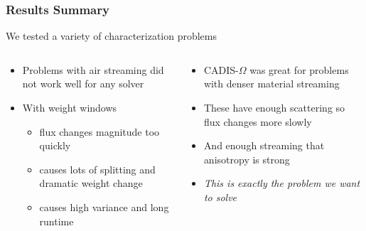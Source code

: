 \documentclass[xcolor=x11names,compress]{beamer}
\renewcommand{\(}{\begin{columns}}
\renewcommand{\)}{\end{columns}}
\newcommand{\<}[1]{\begin{column}{#1}}
\renewcommand{\>}{\end{column}}
\begin{document}
\begin{frame}[fragile]

  \frametitle{Results Summary}

    We tested a variety of characterization problems  
    \begin{columns}
    \begin{column}{0.5\textwidth}
    \begin{itemize}
       \item Problems with air streaming did not work well for any solver
       \item With weight windows
       \begin{itemize}
         \item flux changes magnitude too quickly
         \item causes lots of splitting and dramatic weight change
         \item causes high variance and long runtime
       \end{itemize}       
    \end{itemize}
    \end{column}    

    \begin{column}{0.5\textwidth}
    \begin{itemize}
       \item CADIS-$\Omega$ was great for problems with denser material streaming 
       \item These have enough scattering so flux changes more slowly
       \item And enough streaming that anisotropy is strong
       \item \textit{This is exactly the problem we want to solve}
    \end{itemize}   
    \end{column}
    \end{columns}   

\end{frame}




\end{document}
